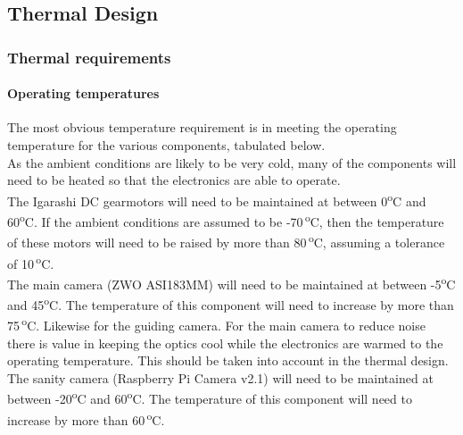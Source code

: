 \pagebreak
\subsection{Thermal Design} 
\label{Thermal_section}















\subsubsection{Thermal requirements}

\paragraph{Operating temperatures}

The most obvious temperature requirement is in meeting the operating temperature for the various components, tabulated below.\\ 



As the ambient conditions are likely to be very cold, many of the components will need to be heated so that the electronics are able to operate.\\

The Igarashi DC gearmotors will need to be maintained at between 0\textsuperscript{o}C and 60\textsuperscript{o}C. If the ambient conditions are assumed to be -70\,\textsuperscript{o}C, then the temperature of these motors will need to be raised by more than 80\,\textsuperscript{o}C, assuming a tolerance of 10\,\textsuperscript{o}C.\\

The main camera (ZWO ASI183MM) will need to be maintained at between -5\textsuperscript{o}C and 45\textsuperscript{o}C. The temperature of this component will need to increase by more than 75\,\textsuperscript{o}C. Likewise for the guiding camera. For the main camera to reduce noise there is value in keeping the optics cool while the electronics are warmed to the operating temperature. This should be taken into account in the thermal design.\\

The sanity camera (Raspberry Pi Camera v2.1) will need to be maintained at between -20\textsuperscript{o}C and 60\textsuperscript{o}C. The temperature of this component will need to increase by more than 60\,\textsuperscript{o}C.\\

